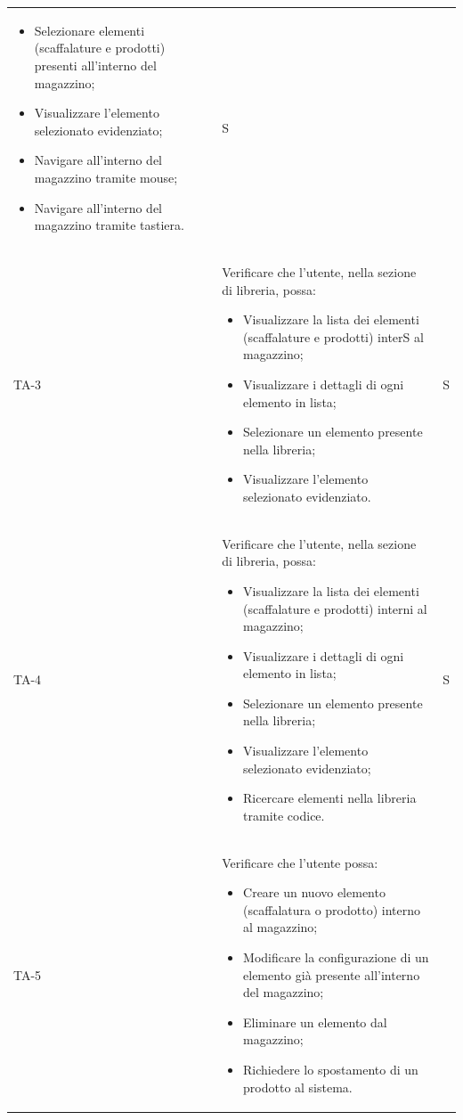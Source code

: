 \begin{xltabular}{0.9\textwidth}{X | p{0.7\textwidth} | X}
\begin{itemize}
\begin{itemize}
        \end{itemize}
        \item Selezionare elementi (scaffalature e prodotti) presenti all'interno del magazzino;
        \item Visualizzare l'elemento selezionato evidenziato;
        \item Navigare all'interno del magazzino tramite mouse;
        \item Navigare all'interno del magazzino tramite tastiera.
    \end{itemize}
    & S\\
    TA-3 & Verificare che l'utente, nella sezione di libreria, possa:
    \begin{itemize}
        \item Visualizzare la lista dei elementi (scaffalature e prodotti) interS al magazzino;
        \item Visualizzare i dettagli di ogni elemento in lista;
        \item Selezionare un elemento presente nella libreria;
        \item Visualizzare l'elemento selezionato evidenziato.
    \end{itemize}
    & S \\
    TA-4 & Verificare che l'utente, nella sezione di libreria, possa:
    \begin{itemize}
        \item Visualizzare la lista dei elementi (scaffalature e prodotti) interni al magazzino;
        \item Visualizzare i dettagli di ogni elemento in lista;
        \item Selezionare un elemento presente nella libreria;
        \item Visualizzare l'elemento selezionato evidenziato;
        \item Ricercare elementi nella libreria tramite codice.
    \end{itemize}
    & S \\
    TA-5 & Verificare che l'utente possa:
    \begin{itemize}
        \item Creare un nuovo elemento (scaffalatura o prodotto) interno al magazzino;
        \item Modificare la configurazione di un elemento già presente all'interno del magazzino;
        \item Eliminare un elemento dal magazzino;
        \item Richiedere lo spostamento di un prodotto al sistema.

\end{itemize}
\end{xltabular}
